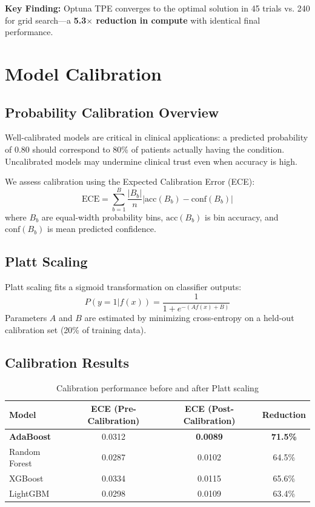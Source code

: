 \documentclass[11pt,a4paper]{article}
\begin{document}
\textbf{Key Finding:} Optuna TPE converges to the optimal solution in 45 trials vs. 240 for grid search---a \textbf{5.3$\times$ reduction in compute} with identical final performance.

\section{Model Calibration}

\subsection{Probability Calibration Overview}

Well-calibrated models are critical in clinical applications: a predicted probability of 0.80 should correspond to 80\% of patients actually having the condition. Uncalibrated models may undermine clinical trust even when accuracy is high.

We assess calibration using the Expected Calibration Error (ECE):
\begin{equation}
\text{ECE} = \sum_{b=1}^{B} \frac{|B_b|}{n} \left| \text{acc}(B_b) - \text{conf}(B_b) \right|
\end{equation}
where $B_b$ are equal-width probability bins, $\text{acc}(B_b)$ is bin accuracy, and $\text{conf}(B_b)$ is mean predicted confidence.

\subsection{Platt Scaling}

Platt scaling \citep{platt1999probabilistic} fits a sigmoid transformation on classifier outputs:
\begin{equation}
P(y=1 | f(x)) = \frac{1}{1 + e^{-(Af(x) + B)}}
\end{equation}
Parameters $A$ and $B$ are estimated by minimizing cross-entropy on a held-out calibration set (20\% of training data).

\subsection{Calibration Results}

\begin{table}[H]
\centering
\caption{Calibration performance before and after Platt scaling}
\begin{tabular}{lccc}
\toprule
\textbf{Model} & \textbf{ECE (Pre-Calibration)} & \textbf{ECE (Post-Calibration)} & \textbf{Reduction} \\
\midrule
\textbf{AdaBoost} & 0.0312 & \textbf{0.0089} & \textbf{71.5\%} \\
Random Forest & 0.0287 & 0.0102 & 64.5\% \\
XGBoost & 0.0334 & 0.0115 & 65.6\% \\
LightGBM & 0.0298 & 0.0109 & 63.4\% \\
\bottomrule
\end{tabular}
\label{tab:calibration}
\end{table}
\end{document}
